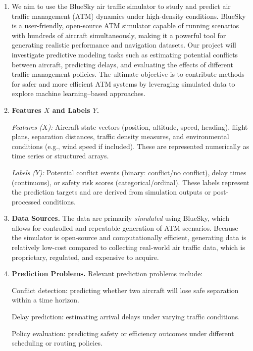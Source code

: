 \documentclass[a4paper]{article}
\begin{document}
\begin{enumerate}
    \item We aim to use the BlueSky air traffic simulator to study and predict air traffic management (ATM) dynamics under high-density conditions. BlueSky is a user-friendly, open-source ATM simulator capable of running scenarios with hundreds of aircraft simultaneously, making it a powerful tool for generating realistic performance and navigation datasets. Our project will investigate predictive modeling tasks such as estimating potential conflicts between aircraft, predicting delays, and evaluating the effects of different traffic management policies. The ultimate objective is to contribute methods for safer and more efficient ATM systems by leveraging simulated data to explore machine learning–based approaches.

\item \textbf{Features $X$ and Labels $Y$.}

\emph{Features ($X$):} Aircraft state vectors (position, altitude, speed, heading), flight plans, separation distances, traffic density measures, and environmental conditions (e.g., wind speed if included). These are represented numerically as time series or structured arrays.

\emph{Labels ($Y$):} Potential conflict events (binary: conflict/no conflict), delay times (continuous), or safety risk scores (categorical/ordinal). These labels represent the prediction targets and are derived from simulation outputs or post-processed conditions.

\item \textbf{Data Sources.}
The data are primarily \emph{simulated} using BlueSky, which allows for controlled and repeatable generation of ATM scenarios. Because the simulator is open-source and computationally efficient, generating data is relatively low-cost compared to collecting real-world air traffic data, which is proprietary, regulated, and expensive to acquire.

\item \textbf{Prediction Problems.}
Relevant prediction problems include:

Conflict detection: predicting whether two aircraft will lose safe separation within a time horizon.

Delay prediction: estimating arrival delays under varying traffic conditions.

Policy evaluation: predicting safety or efficiency outcomes under different scheduling or routing policies.


\end{enumerate}
\end{document}
